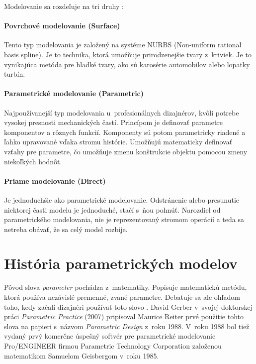 




Modelovanie sa rozdeľuje na tri druhy \cite{recrosio_2017}:

\paragraph{Povrchové modelovanie (Surface)}
Tento typ modelovania je založený na systéme NURBS (Non-uniform rational basis spline). Je to technika, ktorá umožňuje prirodzenejšie tvary z~kriviek. Je to vynikajúca metóda pre  hladké tvary, ako sú karosérie automobilov alebo lopatky turbín.

\paragraph{Parametrické modelovanie (Parametric)}
Najpoužívanejší typ modelovania u~profesionálnych dizajnérov, kvôli potrebe vysokej presnosti mechanických častí. Princípom je definovať parametre komponentov a rôznych funkcií. Komponenty sú potom parametricky riadené a ľahko upravované vďaka  stromu histórie. Umožňujú matematicky definovať vzťahy pre parametre, čo umožňuje zmenu konštrukcie objektu pomocou zmeny niekoľkých hodnôt.

\paragraph{Priame modelovanie (Direct)}
Je jednoduchšie ako parametrické modelovanie. Odstránenie alebo presunutie niektorej časti modelu je jednoduché, stačí s~ňou pohnúť. Narozdiel od parametrického modelovania, nie je reprezentovaný stromom operácií a teda sa netreba obávať, že sa celý model rozbije. 


\section{História parametrických modelov}



Pôvod slova \textit{parameter} pochádza z~matematiky. Popisuje matematickú metódu, ktorá používa nezávislé premenné, zvané parametre. Debatuje sa ale ohľadom toho, kedy začali dizajnéri používať toto slovo \cite{davis_2013}. David Gerber v~svojej doktorskej práci \textit{Parametric Practice} (2007) pripisoval Maurice Reiter prvé použitie tohto slova na papieri s~názvom \textit{Parametric Design} z~roku 1988. V~roku 1988 bol tiež vydaný prvý komerčne úspešný softvér pre parametrické modelovanie \textsf{Pro/ENGINEER} firmou Parametric Technology Corporation založenou matematikom Samuelom Geisbergom v~roku 1985.

